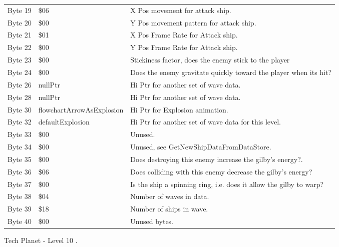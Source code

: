 \begin{figure}[H]
{\begin{adjustbox}{width=12cm}
\begin{tabular}{lll}
 Byte 19 & \$06                       & X Pos movement for attack ship.                                    \\
 Byte 20 & \$00                       & Y Pos movement pattern for attack ship.                            \\
 Byte 21 & \$01                       & X Pos Frame Rate for Attack ship.                                  \\
 Byte 22 & \$00                       & Y Pos Frame Rate for Attack ship.                                  \\
 Byte 23 & \$00                       & Stickiness factor, does the enemy stick to the player              \\
 Byte 24 & \$00                       & Does the enemy gravitate quickly toward the player when its hit?   \\
 Byte 26 & nullPtr                   & Hi Ptr for another set of wave data.                               \\
 Byte 28 & nullPtr                   & Hi Ptr for another set of wave data.                               \\
 Byte 30 & flowchartArrowAsExplosion & Hi Ptr for Explosion animation.                                    \\
 Byte 32 & defaultExplosion          & Hi Ptr for another set of wave data for this level.                \\
 Byte 33 & \$00                       & Unused.                                                            \\
 Byte 34 & \$00                       & Unused, see GetNewShipDataFromDataStore.                           \\
 Byte 35 & \$00                       & Does destroying this enemy increase the gilby's energy?.           \\
 Byte 36 & \$06                       & Does colliding with this enemy decrease the gilby's energy?        \\
 Byte 37 & \$00                       & Is the ship a spinning ring, i.e. does it allow the gilby to warp? \\
 Byte 38 & \$04                       & Number of waves in data.                                           \\
 Byte 39 & \$18                       & Number of ships in wave.                                           \\
 Byte 40 & \$00                       & Unused bytes.                                                      \\
\bottomrule
\end{tabular}

  \end{adjustbox}

  }\caption*{Tech Planet - Level 10
.}
\end{figure}

